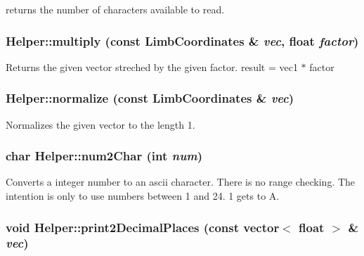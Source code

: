 returns the number of characters available to read. \hypertarget{classHelper_ae7553e9c0e8f9c926a5f2d054d4ed99d}{
\subsubsection[{multiply}]{ Helper::multiply (const {\bf LimbCoordinates} \& {\em vec}, \/  float {\em factor})}}
\label{classHelper_ae7553e9c0e8f9c926a5f2d054d4ed99d}
Returns the given vector streched by the given factor. result = vec1 $\ast$ factor \hypertarget{classHelper_a28f8794505ffca7525c950595a380035}{
\subsubsection[{normalize}]{ Helper::normalize (const {\bf LimbCoordinates} \& {\em vec})}}
\label{classHelper_a28f8794505ffca7525c950595a380035}
Normalizes the given vector to the length 1. \hypertarget{classHelper_a31345c5b0d3a2ab7f8b58d9f97b8657e}{
\subsubsection[{num2Char}]{\setlength{\rightskip}{0pt plus 5cm}char Helper::num2Char (int {\em num})}}
\label{classHelper_a31345c5b0d3a2ab7f8b58d9f97b8657e}
Converts a integer number to an ascii character. There is no range checking. The intention is only to use numbers between 1 and 24. 1 gets to A. \hypertarget{classHelper_ad062c1e9734c97ad2b6ed84ad9bb6bf5}{
\subsubsection[{print2DecimalPlaces}]{\setlength{\rightskip}{0pt plus 5cm}void Helper::print2DecimalPlaces (const vector$<$ float $>$ \& {\em vec})}}
